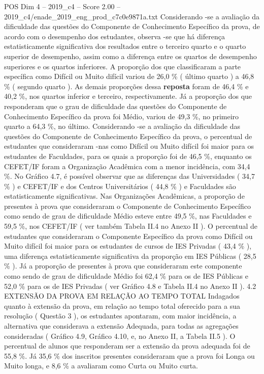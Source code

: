 \begin{textsample}{POS Dim 4 – 2019\_c4 – Score 2.00 – 2019\_c4/enade\_2019\_eng\_prod\_c7c0e9871a.txt}
Considerando -se a avaliação da dificuldade das questões do Componente de Conhecimento Específico da prova, de acordo com o desempenho dos estudantes, observa -se que há diferença estatisticamente significativa dos resultados entre o terceiro quarto e o quarto superior de desempenho, assim como a diferença entre os quartos de desempenho superiores e os quartos inferiores.
A proporção dos que classificaram a parte específica como Difícil ou Muito difícil variou de 26,0 \% ( último quarto ) a 46,8 \% ( segundo quarto ).
As demais proporções dessa \textbf{reposta} foram de 46,4 \% e 40,2 \%, nos quartos inferior e terceiro, respectivamente.
Já a proporção dos que responderam que o grau de dificuldade das questões do Componente de Conhecimento Específico da prova foi Médio, variou de 49,3 \%, no primeiro quarto a 64,3 \%, no último.
Considerando -se a avaliação da dificuldade das questões do Componente de Conhecimento Específico da prova, o percentual de estudantes que consideraram -nas como Difícil ou Muito difícil foi maior para os estudantes de Faculdades, para os quais a proporção foi de 46,5 \%, enquanto os CEFET/IF foram a Organização Acadêmica com a menor incidência, com 34,4 \%.
No Gráfico 4.7, é possível observar que as diferenças das Universidades ( 34,7 \% ) e CEFET/IF e dos Centros Universitários ( 44,8 \% ) e Faculdades são estatisticamente significativas.
Nas Organizações Acadêmicas, a proporção de presentes à prova que consideraram o Componente de Conhecimento Específico como sendo de grau de dificuldade Médio esteve entre 49,5 \%, nas Faculdades e 59,5 \%, nos CEFET/IF ( ver também Tabela II.4 no Anexo II ).
O percentual de estudantes que consideraram o Componente Específico da prova como Difícil ou Muito difícil foi maior para os estudantes de cursos de IES Privadas ( 43,4 \% ), uma diferença estatisticamente significativa da proporção em IES Públicas ( 28,5 \% ).
Já a proporção de presentes à prova que consideraram este componente como sendo de grau de dificuldade Médio foi 62,4 \% para os de IES Públicas e 52,0 \% para os de IES Privadas ( ver Gráfico 4.8 e Tabela II.4 no Anexo II ). 4.2 EXTENSÃO DA PROVA EM RELAÇÃO AO TEMPO TOTAL Indagados quanto à extensão da prova, em relação ao tempo total oferecido para a sua resolução ( Questão 3 ), os estudantes apontaram, com maior incidência, a alternativa que considerava a extensão Adequada, para todas as agregações consideradas ( Gráfico 4.9, Gráfico 4.10, e, no Anexo II, a Tabela II.5 ).
O percentual de alunos que responderam ser a extensão da prova adequada foi de 55,8 \%.
Já 35,6 \% dos inscritos presentes consideraram que a prova foi Longa ou Muito longa, e 8,6 \% a avaliaram como Curta ou Muito curta.

\end{textsample}
